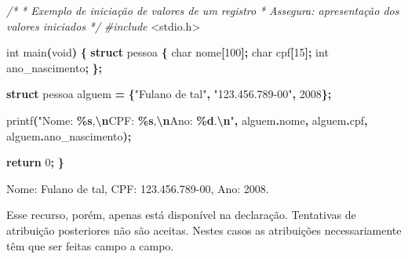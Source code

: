 \documentclass[
  11pt,
  a4paper,
]{scrbook}
\newenvironment{Shaded}{\begin{snugshade}}{\end{snugshade}}
\newcommand{\CommentTok}[1]{\textcolor[rgb]{0.56,0.35,0.01}{\textit{#1}}}
\newcommand{\ControlFlowTok}[1]{\textcolor[rgb]{0.13,0.29,0.53}{\textbf{#1}}}
\newcommand{\DataTypeTok}[1]{\textcolor[rgb]{0.13,0.29,0.53}{#1}}
\newcommand{\DecValTok}[1]{\textcolor[rgb]{0.00,0.00,0.81}{#1}}
\newcommand{\ImportTok}[1]{#1}
\newcommand{\KeywordTok}[1]{\textcolor[rgb]{0.13,0.29,0.53}{\textbf{#1}}}
\newcommand{\NormalTok}[1]{#1}
\newcommand{\OperatorTok}[1]{\textcolor[rgb]{0.81,0.36,0.00}{\textbf{#1}}}
\newcommand{\PreprocessorTok}[1]{\textcolor[rgb]{0.56,0.35,0.01}{\textit{#1}}}
\newcommand{\SpecialCharTok}[1]{\textcolor[rgb]{0.81,0.36,0.00}{\textbf{#1}}}
\newcommand{\StringTok}[1]{\textcolor[rgb]{0.31,0.60,0.02}{#1}}
\begin{document}
\begin{Shaded}
\begin{Highlighting}[]
\CommentTok{/*}
\CommentTok{ * Exemplo de iniciação de valores de um registro}
\CommentTok{ * Assegura: apresentação dos valores iniciados}
\CommentTok{ */}
\PreprocessorTok{\#include }\ImportTok{\textless{}stdio.h\textgreater{}}

\DataTypeTok{int}\NormalTok{ main}\OperatorTok{(}\DataTypeTok{void}\OperatorTok{)} \OperatorTok{\{}
    \KeywordTok{struct}\NormalTok{ pessoa }\OperatorTok{\{}
        \DataTypeTok{char}\NormalTok{ nome}\OperatorTok{[}\DecValTok{100}\OperatorTok{];}
        \DataTypeTok{char}\NormalTok{ cpf}\OperatorTok{[}\DecValTok{15}\OperatorTok{];}
        \DataTypeTok{int}\NormalTok{ ano\_nascimento}\OperatorTok{;}
    \OperatorTok{\};}

    \KeywordTok{struct}\NormalTok{ pessoa alguem }\OperatorTok{=} \OperatorTok{\{}\StringTok{"Fulano de tal"}\OperatorTok{,} \StringTok{"123.456.789{-}00"}\OperatorTok{,} \DecValTok{2008}\OperatorTok{\};}

\NormalTok{    printf}\OperatorTok{(}\StringTok{"Nome: }\SpecialCharTok{\%s}\StringTok{,}\SpecialCharTok{\textbackslash{}n}\StringTok{CPF: }\SpecialCharTok{\%s}\StringTok{,}\SpecialCharTok{\textbackslash{}n}\StringTok{Ano: }\SpecialCharTok{\%d}\StringTok{.}\SpecialCharTok{\textbackslash{}n}\StringTok{"}\OperatorTok{,}\NormalTok{ alguem}\OperatorTok{.}\NormalTok{nome}\OperatorTok{,}\NormalTok{ alguem}\OperatorTok{.}\NormalTok{cpf}\OperatorTok{,}
\NormalTok{           alguem}\OperatorTok{.}\NormalTok{ano\_nascimento}\OperatorTok{);}

    \ControlFlowTok{return} \DecValTok{0}\OperatorTok{;}
\OperatorTok{\}}
\end{Highlighting}
\end{Shaded}

\begin{Shaded}
\begin{Highlighting}[]
\NormalTok{Nome: Fulano de tal,}
\NormalTok{CPF: 123.456.789{-}00,}
\NormalTok{Ano: 2008.}
\end{Highlighting}
\end{Shaded}

Esse recurso, porém, apenas está disponível na declaração. Tentativas de
atribuição posteriores não são aceitas. Nestes casos as atribuições
necessariamente têm que ser feitas campo a campo.
\end{document}
